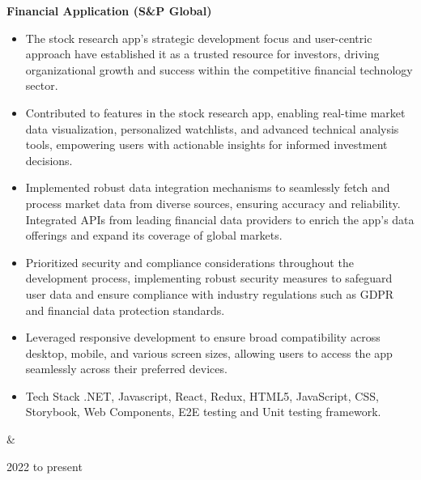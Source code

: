 \documentclass[10pt, letterpaper]{article}
\newenvironment{highlights}{
        \begin{itemize}[
                topsep=0pt,
                parsep=0.10 cm,
                partopsep=0pt,
                itemsep=0pt,
                after=\vspace{-1\baselineskip},
                leftmargin=0.4 cm + 3pt
            ]
    }{
        \end{itemize}
    } %
\let\originalTabularx\tabularx
\let\originalEndTabularx\endtabularx
\renewenvironment{tabularx}{\bgroup\centering\originalTabularx}{\originalEndTabularx\par\egroup}
\begin{document}
        \begin{tabularx}{
            \textwidth-0.4 cm-0.13cm
        }{
            K{0.2 cm}
            R{4.1 cm}
        }
            \textbf{Financial Application (S\&P Global)}

            \vspace{0.10 cm}

            \begin{highlights}
                \item The stock research app's strategic development focus and user-centric approach have established it as a trusted resource for investors, driving organizational growth and success within the competitive financial technology sector.
                \item Contributed to features in the stock research app, enabling real-time market data visualization, personalized watchlists, and advanced technical analysis tools, empowering users with actionable insights for informed investment decisions.
                \item Implemented robust data integration mechanisms to seamlessly fetch and process market data from diverse sources, ensuring accuracy and reliability. Integrated APIs from leading financial data providers to enrich the app's data offerings and expand its coverage of global markets.
                \item Prioritized security and compliance considerations throughout the development process, implementing robust security measures to safeguard user data and ensure compliance with industry regulations such as GDPR and financial data protection standards.
                \item Leveraged responsive development to ensure broad compatibility across desktop, mobile, and various screen sizes, allowing users to access the app seamlessly across their preferred devices.
                \item Tech Stack .NET, Javascript, React, Redux, HTML5, JavaScript, CSS, Storybook, Web Components, E2E testing and Unit testing framework.
            \end{highlights}
            &
            

            2022 to present
        \end{tabularx}
\end{document}
